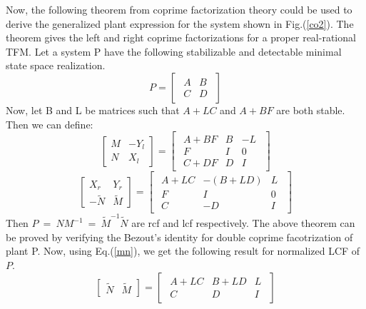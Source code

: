 \documentclass[a4paper,12pt]{article}
\begin{document}
	Now, the following theorem from coprime factorization theory could be used to derive the generalized plant expression for the system shown in Fig.(\ref{co2}).
	The theorem gives the left and right coprime factorizations for a proper real-rational TFM. Let a system P have the following stabilizable and detectable minimal state space realization.
	\begin{equation}
	P =
	\begin{bmatrix}
	\begin{array}{c|c}
	A & B \\ \hline
	C & D	
	\end{array}
	\end{bmatrix}
	\label{min}
	\end{equation}
	Now, let B and L be matrices such that $A+LC$ and $A+BF$ are both stable. Then we can define:
	\begin{equation}
	\begin{bmatrix}
	M & -Y_{l} \\
	N & X_{l}
	\end{bmatrix}
	=
	\begin{bmatrix}
	\begin{array}{c|cc}
	A+BF & B & -L \\ \hline
	F & I & 0\\ 
	C+DF & D & I
	\end{array}
	\end{bmatrix}
	\end{equation}
	\begin{equation}
	\begin{bmatrix}
	X_{r} & Y_{r} \\
	-\tilde{N} & \tilde{M}
	\end{bmatrix}
	=
	\begin{bmatrix}
	\begin{array}{c|cc}
	A+LC & -(B+LD) & L \\ \hline
	F & I & 0\\ 
	C & -D & I
	\end{array}
	\end{bmatrix}
	\label{mn}
	\end{equation}
	Then $P\:=\:NM^{-1}\:=\:\tilde{M}^{-1}\tilde{N}$ are rcf and lcf respectively. The above theorem can be proved by verifying the Bezout's identity for double coprime  facotrization of plant P. Now, using Eq.(\ref{mn}), we get the following result for normalized LCF of $P$.
	\begin{equation}
	\begin{bmatrix}
	\tilde{N} & \tilde{M}
	\end{bmatrix}
	= \begin{bmatrix}
	\begin{array}{c|cc}
	A+LC & B+LD & L \\ \hline C & D & I	
	\end{array}
	\end{bmatrix}
	\label{mn2}
	\end{equation}
\end{document}
